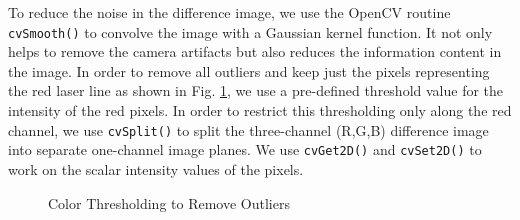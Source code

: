 To reduce the noise in the difference image, we use the OpenCV routine
\texttt{cvSmooth()} to convolve the image with a Gaussian kernel function. It
not only helps to remove the camera artifacts but also reduces the information
content in the image. In order to remove all outliers and keep just the pixels
representing the red laser line as shown in Fig. \ref{figure:color-thres}, we
use a pre-defined threshold value for the intensity of the red pixels. In
order to restrict this thresholding only along the red channel, we use
\texttt{cvSplit()} to split the three-channel (R,G,B) difference image into
separate one-channel image planes. We use \texttt{cvGet2D()} and
\texttt{cvSet2D()} to work on the scalar intensity values of the pixels.


\begin{figure}[ht!]
\centering
{} \quad
{} \hfill
\caption{Color Thresholding to Remove Outliers}
\label{figure:color-thres}
\end{figure}

